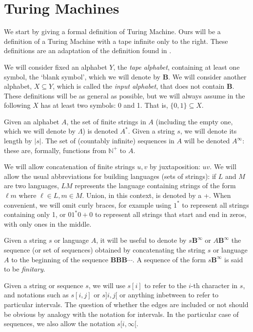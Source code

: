 \documentclass{article}
\newcommand{\B}{\mathbf{B}}
\newcommand{\N}{\mathbb{N}}
\begin{document}

	\section{Turing Machines}

	We start by giving a formal definition of Turing Machine. Ours will be a definition of a Turing Machine with a tape infinite only to the right. These definitions are an adaptation of the definition found in \cite{bridges}.
	
	We will consider fixed an alphabet $Y$, the \emph{tape alphabet}, containing at least one symbol, the `blank symbol', which we will denote by $\B$. We will consider another alphabet, $X \subseteq Y$, which is called the \emph{input alphabet}, that does not contain $\B$. These definitions will be as general as possible, but we will always assume in the following $X$ has at least two symbols: 0 and 1. That is, $\{0,1\} \subseteq X$.
	
	Given an alphabet $A$, the set of finite strings in $A$ (including the empty one, which we will denote by $\Lambda$) is denoted $A^*$. Given a string $s$, we will denote its length by $\lvert s \rvert$. The set of (countably infinite) sequences in $A$ will be denoted $A^\infty$:  these are, formally, functions from $\N^+$ to $A$.
	
	We will allow concatenation of finite strings $u, v$ by juxtaposition: $uv$. We will allow the usual abbreviations for building languages (sets of strings): if $L$ and $M$ are two languages, $LM$ represents the language containing strings of the form $\ell m$ where $\ell \in L, m \in M$. Union, in this context, is denoted by a +. When convenient, we will omit curly braces, for example using $1^*$ to represent all strings containing only 1, or $01^*0 + 0$ to represent all strings that start and end in zeros, with only ones in the middle.
	
	Given a string $s$ or language $A$, it will be useful to denote by $s \B^\infty$ or $A \B^\infty$ the sequence (or set of sequences) obtained by concatenating the string $s$ or language $A$ to the beginning of the sequence $\B\B\B\cdots$. A sequence of the form $s \B^\infty$ is said to be \emph{finitary}.
	
	Given a string or sequence $s$, we will use $s[i]$ to refer to the $i$-th character in $s$, and notations such as $s[i,j]$ or $s]i,j[$ or anything inbetween to refer to particular intervals. The question of whether the edges are included or not should be obvious by analogy with the notation for intervals. In the particular case of sequences, we also allow the notation $s[i, \infty[$.
	
\end{document}
